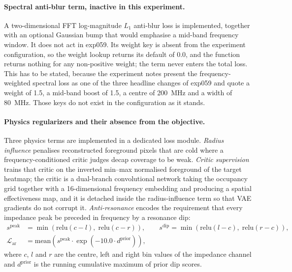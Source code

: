 \paragraph{Spectral anti-blur term, inactive in this experiment.} A two-dimensional FFT
log-magnitude $L_1$ anti-blur loss is implemented, together with an optional Gaussian bump that would
emphasise a mid-band frequency window. It does not act in exp059. Its weight key is absent from the
experiment configuration, so the weight lookup returns its default of 0.0, and the function returns
nothing for any non-positive weight; the term never enters the total loss. This has to be stated,
because the experiment notes present the frequency-weighted spectral loss as one of the three
headline changes of exp059 and quote a weight of 1.5, a mid-band boost of 1.5, a centre of 200~MHz
and a width of 80~MHz. Those keys do not exist in the configuration as it stands.

\paragraph{Physics regularizers and their absence from the objective.} Three physics terms are
implemented in a dedicated loss module. \emph{Radius influence} penalises reconstructed foreground
pixels that are cold where a frequency-conditioned critic judges decap coverage to be weak.
\emph{Critic supervision} trains that critic on the inverted min--max normalised foreground of the
target heatmap; the critic is a dual-branch convolutional network taking the occupancy grid together
with a 16-dimensional frequency embedding and producing a spatial effectiveness map, and it is
detached inside the radius-influence term so that VAE gradients do not corrupt it.
\emph{Anti-resonance} encodes the requirement that every impedance peak be preceded in frequency by a
resonance dip:
\begin{equation}
\begin{aligned}
s^{\mathrm{peak}} &= \min\!\left(\mathrm{relu}(c - l), \; \mathrm{relu}(c - r)\right), \qquad
s^{\mathrm{dip}} = \min\!\left(\mathrm{relu}(l - c), \; \mathrm{relu}(r - c)\right), \\
\mathcal{L}_{\mathrm{ar}} &= \mathrm{mean}\!\left(s^{\mathrm{peak}} \cdot \exp(-10.0 \cdot d^{\mathrm{prior}})\right),
\end{aligned}
\label{eq:anti_resonance}
\end{equation}
where $c$, $l$ and $r$ are the centre, left and right bin values of the impedance channel and
$d^{\mathrm{prior}}$ is the running cumulative maximum of prior dip scores.

